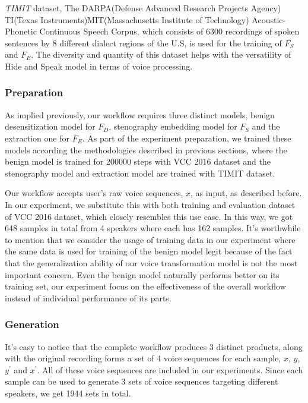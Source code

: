 \documentclass[journal]{IEEEtran} %
\begin{document}
\textit{TIMIT} dataset, The DARPA(Defense Advanced Research Projects Agency) TI(Texas Instruments)MIT(Massachusetts Institute of Technology) Acoustic-Phonetic Continuous Speech Corpus, which consists of 6300 recordings of spoken sentences by 8 different dialect regions of the U.S, is used for the training of $F_S$ and $F_E$. The diversity and quantity of this dataset helps with the versatility of Hide and Speak model in terms of voice processing.

\subsubsection{Preparation}

As implied previously, our workflow requires three distinct models, benign desensitization model for $F_D$, stenography embedding model for $F_S$ and the extraction one for $F_E$. As part of the experiment preparation, we trained these models according the methodologies described in previous sections, where the benign model is trained for 200000 steps with VCC 2016 dataset and the stenography model and extraction model are trained with TIMIT dataset.

Our workflow accepts user's raw voice sequences, $x$, as input, as described before. In our experiment, we substitute this with both training and evaluation dataset of VCC 2016 dataset, which closely resembles this use case. In this way, we got 648 samples in total from 4 speakers where each has 162 samples. It's worthwhile to mention that we consider the usage of training data in our experiment where the same data is used for training of the benign model legit because of the fact that the generalization ability of our voice transformation model is not the most important concern. Even the benign model naturally performs better on its training set, our experiment focus on the effectiveness of the overall workflow instead of individual performance of its parts.

\subsubsection{Generation}

It's easy to notice that the complete workflow produces 3 distinct products, along with the original recording forms a set of 4 voice sequences for each sample, $x$, $y$, $y^{\prime}$ and $x^{\prime}$. All of these voice sequences are included in our experiments. Since each sample can be used to generate 3 sets of voice sequences targeting different speakers, we get 1944 sets in total.
\end{document}
